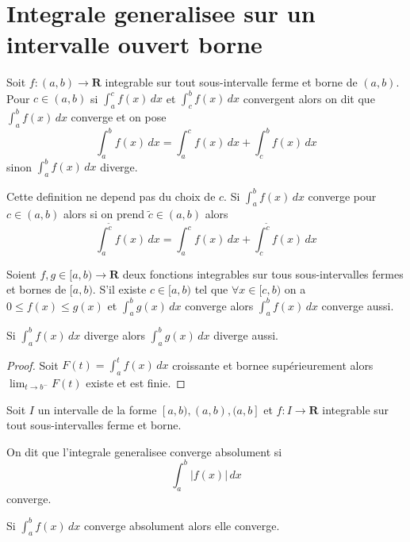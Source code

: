 \section{Integrale generalisee sur un intervalle ouvert borne}
\begin{definition}

Soit $f:(a,b)\to \mathbf{R}$ integrable sur tout sous-intervalle ferme et borne de $(a,b)$. Pour $c\in(a,b)$ si $\int_{a}^{c} f(x) \, dx$ et $\int_{c}^{b} f(x) \, dx$ convergent alors on dit que $\int_{a}^{b} f(x) \, dx$ converge et on pose
$$
\int_{a}^{b} f(x) \, dx =\int_{a}^{c} f(x) \, dx +\int_{c}^{b} f(x) \, dx 
$$
sinon $\int_{a}^{b} f(x) \, dx$ diverge.
\end{definition}
\begin{remark}
Cette definition ne depend pas du choix de $c$. Si $\int_{a}^{b} f(x) \, dx$ converge pour $c\in(a,b)$ alors si on prend $\tilde{c}\in(a,b)$ alors
$$
\int_{a}^{\tilde{c}} f(x) \, dx=\int_{a}^{c} f(x) \, dx +\int_{c}^{\tilde{c}} f(x) \, dx
$$
\end{remark}

\begin{lemma}
Soient $f,g\in[a,b)\to \mathbf{R}$ deux fonctions integrables sur tous sous-intervalles fermes et bornes de $[a,b)$. S'il existe $c\in[a,b)$ tel que $\forall x \in [c,b)$ on a $0\leq f(x)\leq g(x)$ et $\int_{a}^{b} g(x) \, dx$ converge alors $\int_{a}^{b}f(x)  \, dx$ converge aussi.

Si $\int_{a}^{b} f(x) \, dx$ diverge alors $\int_{a}^{b}g(x)  \, dx$ diverge aussi.
\end{lemma}
\begin{proof}
Soit $F(t)=\int_{a}^{t} f(x) \, dx$ croissante et bornee supérieurement alors $\lim_{ t \to b^{-} }F(t)$ existe et est finie.
\end{proof}
\begin{definition}
Soit $I$ un intervalle de la forme $[a,b),(a,b),(a,b]$ et $f:I\to \mathbf{R}$ integrable sur tout sous-intervalles ferme et borne.

On dit que l'integrale generalisee converge absolument si
$$
\int_{a}^{b} |f(x)| \, dx
$$
converge.
\end{definition}
\begin{remark}
Si $\int_{a}^{b} f(x) \, dx$ converge absolument alors elle converge. 
\end{remark}
